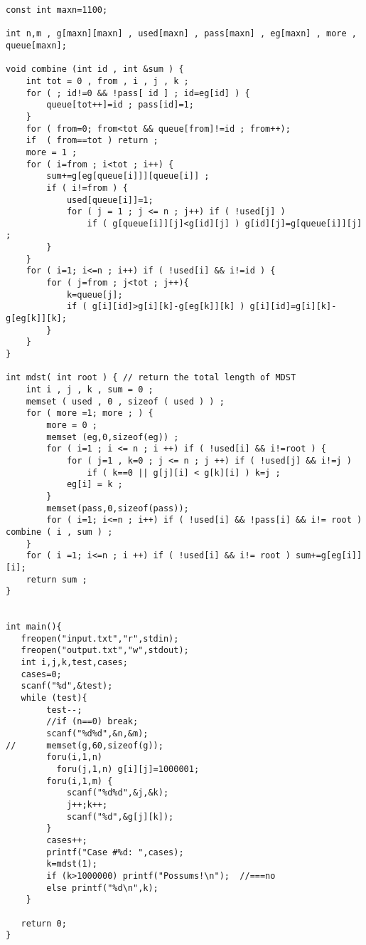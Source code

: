 
	\begin{lstlisting}
const int maxn=1100;

int n,m , g[maxn][maxn] , used[maxn] , pass[maxn] , eg[maxn] , more , queue[maxn]; 	 

void combine (int id , int &sum ) {
	int tot = 0 , from , i , j , k ; 		 
	for ( ; id!=0 && !pass[ id ] ; id=eg[id] ) { 
		queue[tot++]=id ; pass[id]=1;
	} 
	for ( from=0; from<tot && queue[from]!=id ; from++);
	if  ( from==tot ) return ; 
	more = 1 ;
	for ( i=from ; i<tot ; i++) { 
		sum+=g[eg[queue[i]]][queue[i]] ;
		if ( i!=from ) { 
			used[queue[i]]=1;
			for ( j = 1 ; j <= n ; j++) if ( !used[j] )
				if ( g[queue[i]][j]<g[id][j] ) g[id][j]=g[queue[i]][j] ;
		}
	}
	for ( i=1; i<=n ; i++) if ( !used[i] && i!=id ) { 
		for ( j=from ; j<tot ; j++){ 
			k=queue[j];
			if ( g[i][id]>g[i][k]-g[eg[k]][k] ) g[i][id]=g[i][k]-g[eg[k]][k];
		}
	}
}
	
int mdst( int root ) { // return the total length of MDST 
	int i , j , k , sum = 0 ; 	 
	memset ( used , 0 , sizeof ( used ) ) ; 	 
	for ( more =1; more ; ) { 
		more = 0 ; 
		memset (eg,0,sizeof(eg)) ; 	 
		for ( i=1 ; i <= n ; i ++) if ( !used[i] && i!=root ) {
			for ( j=1 , k=0 ; j <= n ; j ++) if ( !used[j] && i!=j ) 	 
				if ( k==0 || g[j][i] < g[k][i] ) k=j ; 
			eg[i] = k ; 	 
		} 
		memset(pass,0,sizeof(pass)); 
		for ( i=1; i<=n ; i++) if ( !used[i] && !pass[i] && i!= root ) combine ( i , sum ) ; 	 
	}
	for ( i =1; i<=n ; i ++) if ( !used[i] && i!= root ) sum+=g[eg[i]][i];
	return sum ; 	 
} 	 


int main(){
   freopen("input.txt","r",stdin);
   freopen("output.txt","w",stdout);
   int i,j,k,test,cases;
   cases=0;
   scanf("%d",&test);
   while (test){
		test--;
		//if (n==0) break;
		scanf("%d%d",&n,&m);
//		memset(g,60,sizeof(g));
		foru(i,1,n)
		  foru(j,1,n) g[i][j]=1000001;
		foru(i,1,m) {
			scanf("%d%d",&j,&k);
			j++;k++;
			scanf("%d",&g[j][k]);	
		}
		cases++;
		printf("Case #%d: ",cases);
		k=mdst(1);
		if (k>1000000) printf("Possums!\n");  //===no
		else printf("%d\n",k);
	}
   
   return 0;
}
	\end{lstlisting}
